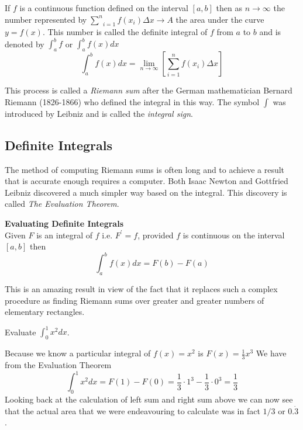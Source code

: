 If $f$ is a continuous function defined on the interval $\left [a ,b\right ]$ then as $n \rightarrow \infty $ the number represented by$\;\underset{i =1}{\sum ^{n}} f (x_{i})  \Delta x \rightarrow A$ the area under the curve $y =f (x)$. This number is called the definite integral of $f$ from $a$ to $b$ and is denoted by $\int _{a}^{b}f$ or $\int _{a}^{b}f (x) d x$
\begin{equation*}\int _{a}^{b}f (x) d x =\underset{n \rightarrow \infty }{\lim }\left [\underset{i =1}{\sum ^{n}} f (x_{i})  \Delta x\right ]
\end{equation*}

This process is called a \emph{Riemann sum} after the German mathematician Bernard Riemann (1826-1866) who defined the integral in this way. The symbol $\int $ was introduced by Leibniz and is called the \emph{integral sign}. 

\subsection*{Definite Integrals}
The method of computing Riemann sums is often long and to achieve a result that is accurate enough requires a computer. Both Isaac Newton and Gottfried Leibniz discovered a much simpler way based on the integral. This discovery is called \emph{The Evaluation Theorem}. 

\begin{tcolorbox}
\textbf{Evaluating Definite Integrals}\\Given $F$ is an integral of $f$ i.e. $F^{ \prime } =f$, provided $f$ is continuous on the interval $[a ,b]$ then 
\[\int _{a}^{b}f (x) d x =F (b) -F (a)\]
\end{tcolorbox}

This is an amazing result in view of the fact that it replaces such a complex procedure as finding
Riemann sums over greater and greater numbers of elementary rectangles. 

\example Evaluate $\int _{0}^{1}x^{2} d x$. 

\solution Because we know a particular integral of $f (x) =x^{2}$ is $F (x) =\frac{1}{3} x^{3}$ We have from the Evaluation Theorem
\begin{equation*}\int _{0}^{1}x^{2} d x =F (1) -F (0) =\frac{1}{3} \cdot 1^{3} -\frac{1}{3} \cdot 0^{3} =\frac{1}{3}
\end{equation*}
Looking back at the calculation of left sum and right sum above we can now see that the actual area
that we were endeavouring to calculate was in fact $1/3$ or $0. \dot{3}$. 

